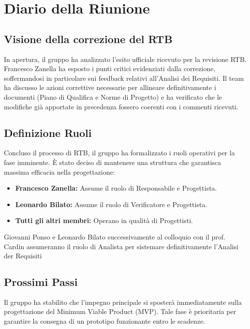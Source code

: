 \documentclass[a4paper, 11pt, oneside]{scrartcl} %
\begin{document}
\newpage
\section{Diario della Riunione}

\subsection{Visione della correzione del RTB}
In apertura, il gruppo ha analizzato l'esito ufficiale ricevuto per la revisione RTB. Francesco Zanella ha esposto i punti critici evidenziati dalla correzione, soffermandosi in particolare sui feedback relativi all'Analisi dei Requisiti. Il team ha discusso le azioni correttive necessarie per allineare definitivamente i documenti (Piano di Qualifica e Norme di Progetto) e ha verificato che le modifiche già apportate in precedenza fossero coerenti con i commenti ricevuti.

\subsection{Definizione Ruoli}
Concluso il processo di RTB, il gruppo ha formalizzato i ruoli operativi per la fase imminente. È stato deciso di mantenere una struttura che garantisca massima efficacia nella progettazione:
\begin{itemize}
    \item \textbf{Francesco Zanella:} Assume il ruolo di Responsabile e Progettista.
    \item \textbf{Leonardo Bilato:} Assume il ruolo di Verificatore e Progettista.
    \item \textbf{Tutti gli altri membri:} Operano in qualità di Progettisti.
\end{itemize}
Giovanni Ponso e Leonardo Bilato successivamente al colloquio con il prof. Cardin assumeranno il ruolo di Analista per sistemare definitivamente l'Analisi der Requisiti

\subsection{Prossimi Passi}
Il gruppo ha stabilito che l'impegno principale si sposterà immediatamente sulla progettazione del Minimum Viable Product (MVP). Tale fase è prioritaria per garantire la consegna di un prototipo funzionante entro le scadenze.
\end{document}
